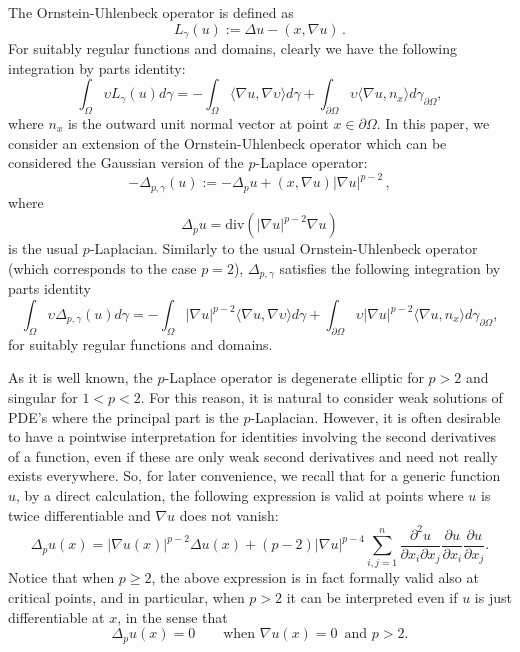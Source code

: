 \documentclass[12pt]{amsart}
\newcommand{\1}{\mathbf 1}
\begin{document}
The Ornstein-Uhlenbeck operator is defined as
\begin{equation}\label{OU1}
L_\gamma(u):=\Delta u-(x,\nabla u)\,.
\end{equation}
For suitably regular functions and domains, clearly we have the following integration by parts identity:
\[
\int_{\Omega} \upsilon L_\gamma (u) d\gamma=-\int_\Omega \langle \nabla u, \nabla \upsilon \rangle d\gamma+\int_{\partial \Omega} \upsilon \langle \nabla u, n_x \rangle d\gamma_{\partial \Omega},
\]
where $n_x$ is the outward unit normal vector at point $x\in \partial \Omega$. In this paper, we consider an extension of the Ornstein-Uhlenbeck operator which can be considered the Gaussian version of the $p$-Laplace operator:
\begin{equation}
-\Delta_{p,\gamma} (u):= -\Delta_pu+(x,\nabla u)|\nabla u|^{p-2}\,,
\end{equation}
where $$
\Delta_pu=\mathrm{div} (|\nabla u|^{p-2}\nabla u)$$
is the usual $p$-Laplacian.
Similarly to the usual  Ornstein-Uhlenbeck operator (which corresponds to the case $p=2$), $\Delta_{p,\gamma}$ satisfies the following integration by parts identity
\[
\int_{\Omega} \upsilon \Delta_{p,\gamma}(u)  d\gamma=-\int_\Omega |\nabla u|^{p-2}\langle \nabla u, \nabla \upsilon \rangle d\gamma+\int_{\partial \Omega} \upsilon |\nabla u|^{p-2}\langle \nabla u, n_x \rangle d\gamma_{\partial \Omega},
\]
for suitably regular functions and domains.

As it is well known, the $p$-Laplace operator is degenerate elliptic for $p>2$ and singular for $1<p<2$. For this reason, it is natural to consider weak solutions of PDE's where the principal part is the $p$-Laplacian. However, it is often desirable to have a pointwise interpretation for identities involving the second derivatives of a function, even if these are only weak second derivatives and need not really exists everywhere.
So, for later convenience, we recall that for a generic function $u$, by a direct calculation, the following expression is valid at points where $u$ is twice differentiable and $\nabla u$ does not vanish:
\begin{equation}\label{p-Lapla-form}
\Delta_p u(x)=|\nabla u(x)|^{p-2} \Delta u(x)+(p-2)|\nabla u|^{p-4}\sum_{i,j=1}^n  \frac{\partial^2 u}{\partial x_i \partial x_j}\frac{\partial u}{\partial x_i} \frac{\partial u}{\partial x_j}  .
\end{equation}
Notice that when $p\geq 2$, the above expression is in fact formally valid also at critical points, and in particular, when $p>2$ it can be interpreted even if $u$ is just differentiable at $x$, in the sense that
$$
\Delta_pu(x)=0\qquad\text{when }\nabla u(x)=0\,\text{ and }p>2.
$$
\end{document}
